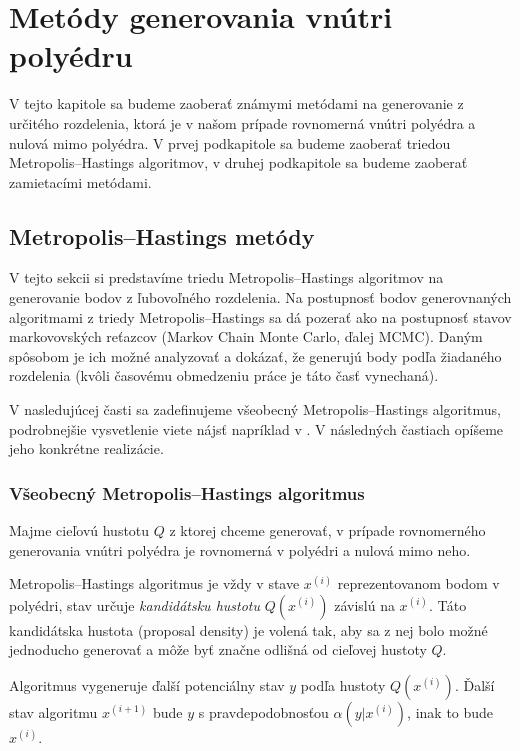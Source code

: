 \chapter{Metódy generovania vnútri polyédru}

V tejto kapitole sa budeme zaoberať známymi metódami na generovanie z určitého rozdelenia, ktorá je v našom prípade rovnomerná vnútri polyédra a nulová mimo polyédra. V prvej podkapitole sa budeme zaoberať triedou Metropolis--Hastings algoritmov, v druhej podkapitole sa budeme zaoberať zamietacími metódami.

\section{Metropolis--Hastings metódy}

V tejto sekcii si predstavíme triedu Metropolis--Hastings algoritmov na generovanie bodov z ľubovoľného rozdelenia. Na postupnosť bodov generovnaných algoritmami z triedy Metropolis--Hastings sa dá pozerať ako na postupnosť stavov markovovských reťazcov (Markov Chain Monte Carlo, ďalej MCMC). Daným spôsobom je ich možné analyzovať a dokázať, že generujú body podľa žiadaného rozdelenia (kvôli časovému obmedzeniu práce je táto časť vynechaná).

V nasledujúcej časti sa zadefinujeme všeobecný Metropolis--Hastings algoritmus, podrobnejšie vysvetlenie viete nájsť napríklad v \cite{metropolis-hastings_chib}. V následných častiach opíšeme jeho konkrétne realizácie.

\subsection{Všeobecný Metropolis--Hastings algoritmus}

Majme cieľovú hustotu $Q$ z ktorej chceme generovať, v prípade rovnomerného generovania vnútri polyédra je rovnomerná v polyédri a nulová mimo neho.

Metropolis--Hastings algoritmus \cite{metropolis-hastings_chib} je vždy v stave $x^{(i)}$ reprezentovanom bodom v polyédri, stav určuje \textit{kandidátsku hustotu} $Q(x^{(i)})$ závislú na $x^{(i)}$. Táto kandidátska hustota (proposal density) je volená tak, aby sa z nej bolo možné jednoducho generovať a môže byť značne odlišná od cieľovej hustoty $Q$.

Algoritmus vygeneruje ďalší potenciálny stav $y$ podľa hustoty $Q(x^{(i)})$. Ďalší stav algoritmu $x^{(i+1)}$ bude $y$ s pravdepodobnosťou $\alpha (y|x^{(i)})$, inak to bude $x^{(i)}$.

